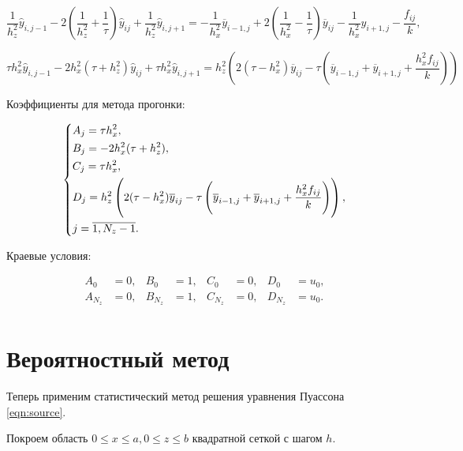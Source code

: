 \documentclass[12pt, a4paper]{article}
\begin{document}
\begin{equation}
	\frac1{h_z^2} \hat y_{i, j - 1} - 2 \left(\frac1{h_z^2} + \frac1\tau \right)\hat y_{ij} + \frac1{h_z^2}\hat y_{i, j + 1}
	= -\frac1{h_x^2}\overline y_{i - 1, j} + 2\left(\frac1{h_x^2} - \frac1\tau\right)\overline y_{ij} - \frac1{h_x^2}y_{i + 1, j} - \frac{f_{ij}}k,
\end{equation}

\begin{equation}
	\tau h_x^2 \hat y_{i, j - 1} - 2h_x^2(\tau + h_z^2)\hat y_{ij} + \tau h_x^2 \hat y_{i, j + 1}
	= h_z^2 \left( 2(\tau - h_x^2)\overline y_{ij} - \tau \left( \overline y_{i - 1, j} + \overline y_{i + 1, j} + \frac{h_x^2 f_{ij}}k \right) \right)
\end{equation}

Коэффициенты для метода прогонки:

\begin{equation}
	\begin{dcases}
		A_j = \tau h_x^2, \\
		B_j = -2h_x^2(\tau + h_z^2), \\
		C_j = \tau h_x^2, \\
		D_j = h_z^2 \left( 2(\tau - h_x^2)\overline y_{ij} - \tau \left( \overline y_{i - 1, j} + \overline y_{i + 1, j} + \frac{h_x^2 f_{ij}}k \right) \right), \\
		j = \overline{1, N_z - 1}. \\
	\end{dcases}
\end{equation}

Краевые условия:

\begin{equation}
	\begin{aligned}
		A_0     &= 0, & B_0     &= 1, & C_0     &= 0, & D_0     &= u_0, \\
		A_{N_z} &= 0, & B_{N_z} &= 1, & C_{N_z} &= 0, & D_{N_z} &= u_0. \\
	\end{aligned}
\end{equation}

\section{Вероятностный метод}

Теперь применим статистический метод решения уравнения Пуассона \eqref{eqn:source}.

Покроем область $0 \leqslant x \leqslant a, 0 \leqslant z \leqslant b$ квадратной сеткой с шагом $h$.
\end{document}
